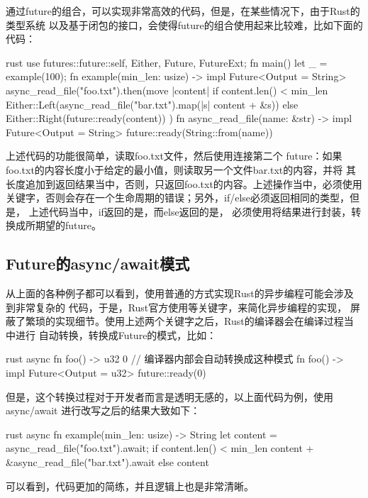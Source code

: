 通过future的组合，可以实现非常高效的代码，但是，在某些情况下，由于Rust的类型系统
以及基于闭包的接口，会使得future的组合使用起来比较难，比如下面的代码：
\begin{code-block}{rust}
use futures::future::{self, Either, Future, FutureExt};
fn main() {
    let _ = example(100);
}
fn example(min_len: usize) -> impl Future<Output = String> {
    async_read_file("foo.txt").then(move |content| {
        if content.len() < min_len {
            Either::Left(async_read_file("bar.txt").map(|s| content + &s))
        } else {
            Either::Right(future::ready(content))
        }
    })
}
fn async_read_file(name: &str) -> impl Future<Output = String> {
    future::ready(String::from(name))
}
\end{code-block}
上述代码的功能很简单，读取foo.txt文件，然后使用连接第二个
future：如果foo.txt的内容长度小于给定的最小值，则读取另一个文件bar.txt的内容，并将
其长度追加到返回结果当中，否则，只返回foo.txt的内容。上述操作当中，必须使用
关键字，否则会存在一个生命周期的错误；另外，if/else必须返回相同的类型，但是，
上述代码当中，if返回的是，而else返回的是，
必须使用将结果进行封装，转换成所期望的future。

\subsection{Future的async/await模式}
从上面的各种例子都可以看到，使用普通的方式实现Rust的异步编程可能会涉及到非常复杂的
代码，于是，Rust官方使用等关键字，来简化异步编程的实现，
屏蔽了繁琐的实现细节。使用上述两个关键字之后，Rust的编译器会在编译过程当中进行
自动转换，转换成Future的模式，比如：
\begin{code-block}{rust}
async fn foo() -> u32 {
    0
}
// 编译器内部会自动转换成这种模式
fn foo() -> impl Future<Output = u32> {
    future::ready(0)
}
\end{code-block}

但是，这个转换过程对于开发者而言是透明无感的，以上面代码为例，使用async/await
进行改写之后的结果大致如下：
\begin{code-block}{rust}
async fn example(min_len: usize) -> String {
    let content = async_read_file("foo.txt").await;
    if content.len() < min_len {
        content + &async_read_file("bar.txt").await
    } else {
        content
    }
}
\end{code-block}
可以看到，代码更加的简练，并且逻辑上也是非常清晰。

